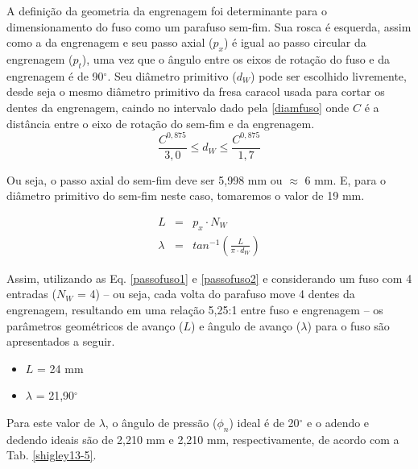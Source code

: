 A definição da geometria da engrenagem foi determinante para o dimensionamento do fuso como um parafuso sem-fim. Sua rosca é esquerda, assim como a da engrenagem e seu passo axial ($p_x$) é igual ao passo circular da engrenagem ($p_t$), uma vez que o ângulo entre os eixos de rotação do fuso e da engrenagem é de 90$^{\circ}$. Seu diâmetro primitivo ($d_W$) pode ser escolhido livremente, desde seja o mesmo diâmetro primitivo da fresa caracol usada para cortar os dentes da engrenagem, caindo no intervalo dado pela \ref{diamfuso} onde $C$ é a distância entre o eixo de rotação do sem-fim e da engrenagem. 
\begin{equation}
\label{diamfuso}
  \frac{C^{0,875}}{3,0} \le d_W \le \frac{C^{0,875}}{1,7}
\end{equation}

Ou seja, o passo axial do sem-fim deve ser 5,998 mm ou $\approx$ 6 mm. E, para o diâmetro primitivo do sem-fim neste caso, tomaremos o valor de 19 mm.

\begin{eqnarray}
    \label{passofuso1}
    L & = & p_x \cdot N_W \\
    \label{passofuso2}
    \lambda & = & tan^{-1}(\frac{L}{\pi \cdot d_W})
\end{eqnarray}

Assim, utilizando as Eq. \ref{passofuso1} e \ref{passofuso2} e considerando um fuso com 4 entradas ($N_W$ = 4) – ou seja, cada volta do parafuso move 4 dentes da engrenagem, resultando em uma relação 5,25:1 entre fuso e engrenagem – os parâmetros geométricos de avanço ($L$) e ângulo de avanço ($\lambda$) para o fuso são apresentados a seguir.

\begin{itemize} 
    \item $L$ = 24 mm
    \item $\lambda$ = 21,90$^{\circ}$
\end{itemize}

Para este valor de $\lambda$, o ângulo de pressão ($\phi_n$) ideal é de 20$^{\circ}$ e o adendo e dedendo ideais são de 2,210 mm e 2,210 mm, respectivamente, de acordo com a Tab. \ref{shigley13-5}.

